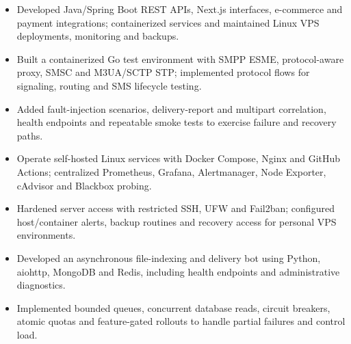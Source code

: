 \begin{itemize}
\item Developed Java/Spring Boot REST APIs, Next.js interfaces, e-commerce and payment integrations; containerized services and maintained Linux VPS deployments, monitoring and backups.
\end{itemize}

\begin{itemize}
\item Built a containerized Go test environment with SMPP ESME, protocol-aware proxy, SMSC and M3UA/SCTP STP; implemented protocol flows for signaling, routing and SMS lifecycle testing.
\item Added fault-injection scenarios, delivery-report and multipart correlation, health endpoints and repeatable smoke tests to exercise failure and recovery paths.
\end{itemize}

\begin{itemize}
\item Operate self-hosted Linux services with Docker Compose, Nginx and GitHub Actions; centralized Prometheus, Grafana, Alertmanager, Node Exporter, cAdvisor and Blackbox probing.
\item Hardened server access with restricted SSH, UFW and Fail2ban; configured host/container alerts, backup routines and recovery access for personal VPS environments.
\end{itemize}

\begin{itemize}
\item Developed an asynchronous file-indexing and delivery bot using Python, aiohttp, MongoDB and Redis, including health endpoints and administrative diagnostics.
\item Implemented bounded queues, concurrent database reads, circuit breakers, atomic quotas and feature-gated rollouts to handle partial failures and control load.
\end{itemize}


